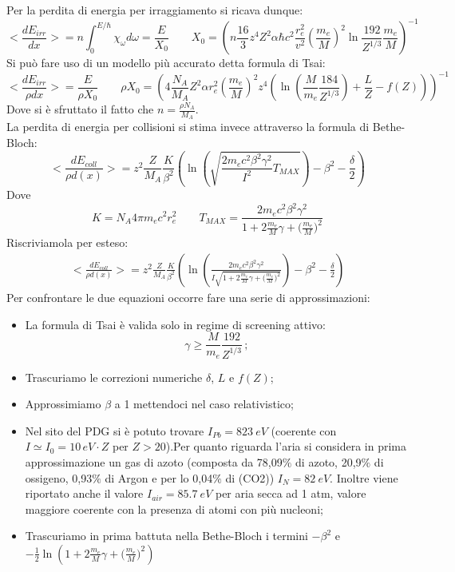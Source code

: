 \documentclass[twoside]{article}
\begin{document}
Per la perdita di energia per irraggiamento si ricava dunque:
\begin{equation}
    <\frac{dE_{irr}}{dx}>=n\int_0^{E/\hbar}\chi_\omega d\omega=\frac{E}{ X_0} \qquad  X_0=\left(n\frac{16}{3}z^4Z^2\alpha \hbar
    c^2\frac{r_e^2}{v^2}\left(\frac{m_e}{M}\right)^2\ln{\frac{192}{Z^{1/3}}\frac{m_e}{M}}\right)^{-1}
\end{equation}
Si può fare uso di un modello più accurato detta formula di Tsai:
\begin{equation}
    <\frac{dE_{irr}}{\rho dx}>=\frac{E}{\rho X_0} \qquad \rho X_0=\left(4\frac{N_A}{M_A}Z^2\alpha r_e^2\left(\frac{m_e}{M}\right)^2z^4\left(\ln(\frac{M}{m_e}\frac{184}{Z^{1/3}})+\frac{L}{Z}-f(Z)\right)\right)^{-1}
\end{equation}
Dove si è sfruttato il fatto che $n=\frac{\rho N_A}{M_A}$.\\
La perdita di energia per collisioni si stima invece attraverso la formula di Bethe-Bloch:
\begin{equation}
    <\frac{dE_{coll}}{\rho d(x)}>= z^2 \frac{Z}{M_A}  \frac{K}{\beta^2} \left(\ln\left(\sqrt{\frac{2m_ec^2\beta^2\gamma^2}{I^2} T_{MAX}}\right)-\beta^2-\frac{\delta}{2}\right)
\end{equation}
Dove 
\begin{equation}
     K=N_A4\pi m_ec^2r_e^2\qquad T_{MAX}=\frac{2m_ec^2\beta^2\gamma^2}{1+2\frac{m_e}{M}\gamma+\biggl(\frac{m_e}{M}\biggr)^2}
\end{equation}
Riscriviamola per esteso:
\begin{align}
    <\frac{dE_{coll}}{\rho d(x)}>= z^2 \frac{Z}{M_A}  \frac{K}{\beta^2} \left(\ln\left(\frac{2m_ec^2\beta^2\gamma^2}{I\sqrt{1+2\frac{m_e}{M}\gamma+\biggl(\frac{m_e}{M}\biggr)^2}} \right)-\beta^2-\frac{\delta}{2}\right)
\end{align}
Per confrontare le due equazioni occorre fare una serie di approssimazioni:
\begin{itemize}
    \item La formula di Tsai è valida solo in regime di screening attivo:
    \begin{equation}
        \gamma\geq\frac{M}{m_e}\frac{192}{Z^{1/3}}\,;
    \end{equation}
    \item Trascuriamo le correzioni numeriche $\delta$, $L$ e $f(Z)$;
    \item Approssimiamo $\beta$ a 1 mettendoci nel caso relativistico;
    \item Nel sito del PDG si è potuto trovare $I_{Pb}=823\ eV$ (coerente con $I\simeq I_0=10 \, eV\cdot Z$ per $Z>20$).Per quanto riguarda l'aria si considera in prima approssimazione un gas di azoto (composta da 78,09$\%$ di azoto, 20,9$\%$ di ossigeno, 0,93$\%$ di Argon e per lo 0,04$\%$ di (CO2)) $I_{N}=82 \ eV$. Inoltre viene riportato anche il valore $I_{air}=85.7 \ eV$ per aria secca ad 1 atm, valore maggiore coerente con la presenza di atomi con più nucleoni;
    \item Trascuriamo in prima battuta nella Bethe-Bloch i termini $-\beta^2$ e $-\frac{1}{2}\ln\left(1+2\frac{m_e}{M}\gamma+\biggl(\frac{m_e}{M}\biggr)^2\right)$
\end{itemize}
\end{document}
